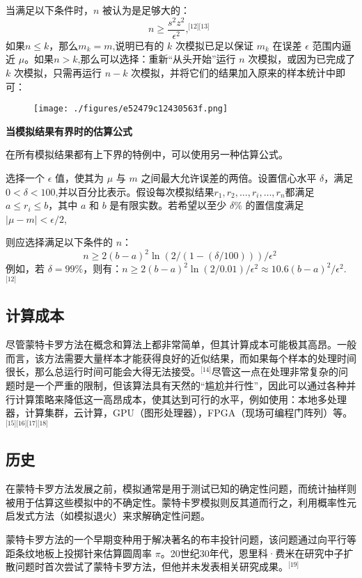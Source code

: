 当满足以下条件时，$n$ 被认为是足够大的：
$$
n \geq \frac{s^2 z^2}{\epsilon^2},^\text{[12][13]}~
$$
如果$n \leq k$，那么$m_k = m$,说明已有的 $k$ 次模拟已足以保证 $m_k$ 在误差 $\epsilon$ 范围内逼近 $\mu$。如果$n > k$,那么可以选择：重新“从头开始”运行 $n$ 次模拟，或因为已完成了 $k$ 次模拟，只需再运行 $n - k$ 次模拟，并将它们的结果加入原来的样本统计中即可：
\begin{figure}[ht]
\centering
\texttt{[image: ./figures/e52479c12430563f.png]}
\caption{} \label{fig_MTKL_5}
\end{figure}
\textbf{当模拟结果有界时的估算公式}

在所有模拟结果都有上下界的特例中，可以使用另一种估算公式。

选择一个 $\epsilon$ 值，使其为 $\mu$ 与 $m$ 之间最大允许误差的两倍。设置信心水平 $\delta$，满足$0 < \delta < 100$,并以百分比表示。假设每次模拟结果$r_1, r_2, \ldots, r_i, \ldots, r_n$都满足$a \leq r_i \leq b$，其中 $a$ 和 $b$ 是有限实数。若希望以至少 $\delta\%$ 的置信度满足$|\mu - m| < \epsilon/2$,

则应选择满足以下条件的 $n$：
$$
n \geq 2(b - a)^2 \ln\left(2/(1 - (\delta/100))\right)/\epsilon^2~
$$
例如，若 $\delta = 99\%$，则有：$n \geq 2(b - a)^2 \ln(2 / 0.01)/\epsilon^2 \approx 10.6(b - a)^2/\epsilon^2$.\(^\text{[12]}\)
\subsection{计算成本}
尽管蒙特卡罗方法在概念和算法上都非常简单，但其计算成本可能极其高昂。一般而言，该方法需要大量样本才能获得良好的近似结果，而如果每个样本的处理时间很长，那么总运行时间可能会大得无法接受。\(^\text{[14]}\)尽管这一点在处理非常复杂的问题时是一个严重的限制，但该算法具有天然的“尴尬并行性”，因此可以通过各种并行计算策略来降低这一高昂成本，使其达到可行的水平，例如使用：本地多处理器，计算集群，云计算，GPU（图形处理器），FPGA（现场可编程门阵列）等。\(^\text{[15][16][17][18]}\)
\subsection{历史}
在蒙特卡罗方法发展之前，模拟通常是用于测试已知的确定性问题，而统计抽样则被用于估算这些模拟中的不确定性。蒙特卡罗模拟则反其道而行之，利用概率性元启发式方法（如模拟退火）来求解确定性问题。

蒙特卡罗方法的一个早期变种用于解决著名的布丰投针问题，该问题通过向平行等距条纹地板上投掷针来估算圆周率 $\pi$。20世纪30年代，恩里科·费米在研究中子扩散问题时首次尝试了蒙特卡罗方法，但他并未发表相关研究成果。\(^\text{[19]}\)

